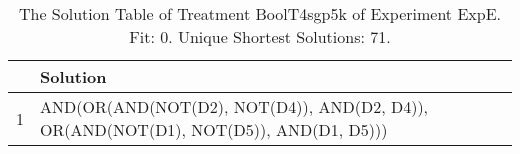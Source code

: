 \begin{table}[ht]
\centering
\begin{tabular}{rp{9cm}}
  \hline
 & Solution \\ 
  \hline
1 & AND(OR(AND(NOT(D2), NOT(D4)), AND(D2, D4)), OR(AND(NOT(D1), NOT(D5)), AND(D1, D5))) \\ 
   \hline
\end{tabular}
\caption{The Solution Table of Treatment BoolT4sgp5k of Experiment ExpE. Fit: 0. Unique Shortest Solutions: 71.} 
\end{table}
